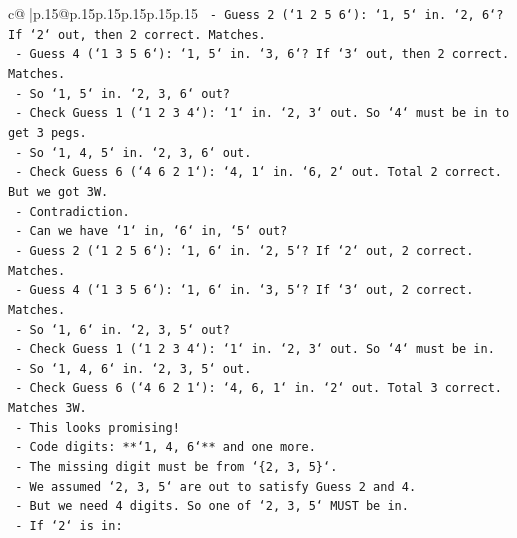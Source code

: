 \documentclass{article}
\begin{document}
{\begin{supertabular}{c@{$\;$}|p{.15\linewidth}@{}p{.15\linewidth}p{.15\linewidth}p{.15\linewidth}p{.15\linewidth}p{.15\linewidth}}
{{{\texttt{                        {-} Guess 2 (`1 2 5 6`): `1, 5` in. `2, 6`? If `2` out, then 2 correct. Matches.} \\
\texttt{                        {-} Guess 4 (`1 3 5 6`): `1, 5` in. `3, 6`? If `3` out, then 2 correct. Matches.} \\
\texttt{                        {-} So `1, 5` in. `2, 3, 6` out?} \\
\texttt{                        {-} Check Guess 1 (`1 2 3 4`): `1` in. `2, 3` out. So `4` must be in to get 3 pegs.} \\
\texttt{                        {-} So `1, 4, 5` in. `2, 3, 6` out.} \\
\texttt{                        {-} Check Guess 6 (`4 6 2 1`): `4, 1` in. `6, 2` out. Total 2 correct. But we got 3W.} \\
\texttt{                        {-} Contradiction.} \\
\texttt{                    {-} Can we have `1` in, `6` in, `5` out?} \\
\texttt{                        {-} Guess 2 (`1 2 5 6`): `1, 6` in. `2, 5`? If `2` out, 2 correct. Matches.} \\
\texttt{                        {-} Guess 4 (`1 3 5 6`): `1, 6` in. `3, 5`? If `3` out, 2 correct. Matches.} \\
\texttt{                        {-} So `1, 6` in. `2, 3, 5` out?} \\
\texttt{                        {-} Check Guess 1 (`1 2 3 4`): `1` in. `2, 3` out. So `4` must be in.} \\
\texttt{                        {-} So `1, 4, 6` in. `2, 3, 5` out.} \\
\texttt{                        {-} Check Guess 6 (`4 6 2 1`): `4, 6, 1` in. `2` out. Total 3 correct. Matches 3W.} \\
\texttt{                        {-} This looks promising!} \\
\texttt{                        {-} Code digits: **`1, 4, 6`** and one more.} \\
\texttt{                        {-} The missing digit must be from `\{2, 3, 5\}`.} \\
\texttt{                        {-} We assumed `2, 3, 5` are out to satisfy Guess 2 and 4.} \\
\texttt{                        {-} But we need 4 digits. So one of `2, 3, 5` MUST be in.} \\
\texttt{                        {-} If `2` is in:} \\
}}}
\end{supertabular}}
\end{document}
